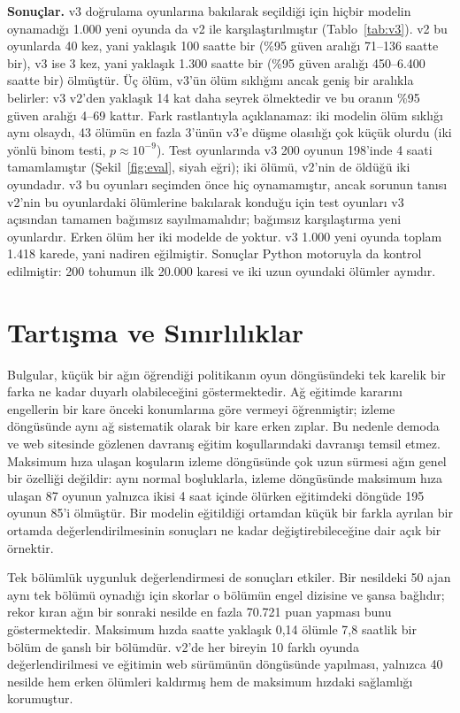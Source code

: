 \documentclass[11pt,a4paper]{article}
\begin{document}
\textbf{Sonuçlar.} v3 doğrulama oyunlarına bakılarak seçildiği için hiçbir modelin oynamadığı 1.000 yeni oyunda da v2 ile karşılaştırılmıştır (Tablo~\ref{tab:v3}). v2 bu oyunlarda 40 kez, yani yaklaşık 100 saatte bir (\%95 güven aralığı 71--136 saatte bir), v3 ise 3 kez, yani yaklaşık 1.300 saatte bir (\%95 güven aralığı 450--6.400 saatte bir) ölmüştür. Üç ölüm, v3'ün ölüm sıklığını ancak geniş bir aralıkla belirler: v3 v2'den yaklaşık 14 kat daha seyrek ölmektedir ve bu oranın \%95 güven aralığı 4--69 kattır. Fark rastlantıyla açıklanamaz: iki modelin ölüm sıklığı aynı olsaydı, 43 ölümün en fazla 3'ünün v3'e düşme olasılığı çok küçük olurdu (iki yönlü binom testi, $p \approx 10^{-9}$). Test oyunlarında v3 200 oyunun 198'inde 4 saati tamamlamıştır (Şekil~\ref{fig:eval}, siyah eğri); iki ölümü, v2'nin de öldüğü iki oyundadır. v3 bu oyunları seçimden önce hiç oynamamıştır, ancak sorunun tanısı v2'nin bu oyunlardaki ölümlerine bakılarak konduğu için test oyunları v3 açısından tamamen bağımsız sayılmamalıdır; bağımsız karşılaştırma yeni oyunlardır. Erken ölüm her iki modelde de yoktur. v3 1.000 yeni oyunda toplam 1.418 karede, yani nadiren eğilmiştir. Sonuçlar Python motoruyla da kontrol edilmiştir: 200 tohumun ilk 20.000 karesi ve iki uzun oyundaki ölümler aynıdır.

\section{Tartışma ve Sınırlılıklar}

Bulgular, küçük bir ağın öğrendiği politikanın oyun döngüsündeki tek karelik bir farka ne kadar duyarlı olabileceğini göstermektedir. Ağ eğitimde kararını engellerin bir kare önceki konumlarına göre vermeyi öğrenmiştir; izleme döngüsünde aynı ağ sistematik olarak bir kare erken zıplar. Bu nedenle demoda ve web sitesinde gözlenen davranış eğitim koşullarındaki davranışı temsil etmez. Maksimum hıza ulaşan koşuların izleme döngüsünde çok uzun sürmesi ağın genel bir özelliği değildir: aynı normal boşluklarla, izleme döngüsünde maksimum hıza ulaşan 87 oyunun yalnızca ikisi 4 saat içinde ölürken eğitimdeki döngüde 195 oyunun 85'i ölmüştür. Bir modelin eğitildiği ortamdan küçük bir farkla ayrılan bir ortamda değerlendirilmesinin sonuçları ne kadar değiştirebileceğine dair açık bir örnektir.

Tek bölümlük uygunluk değerlendirmesi de sonuçları etkiler. Bir nesildeki 50 ajan aynı tek bölümü oynadığı için skorlar o bölümün engel dizisine ve şansa bağlıdır; rekor kıran ağın bir sonraki nesilde en fazla 70.721 puan yapması bunu göstermektedir. Maksimum hızda saatte yaklaşık 0,14 ölümle 7,8 saatlik bir bölüm de şanslı bir bölümdür. v2'de her bireyin 10 farklı oyunda değerlendirilmesi ve eğitimin web sürümünün döngüsünde yapılması, yalnızca 40 nesilde hem erken ölümleri kaldırmış hem de maksimum hızdaki sağlamlığı korumuştur.
\end{document}

